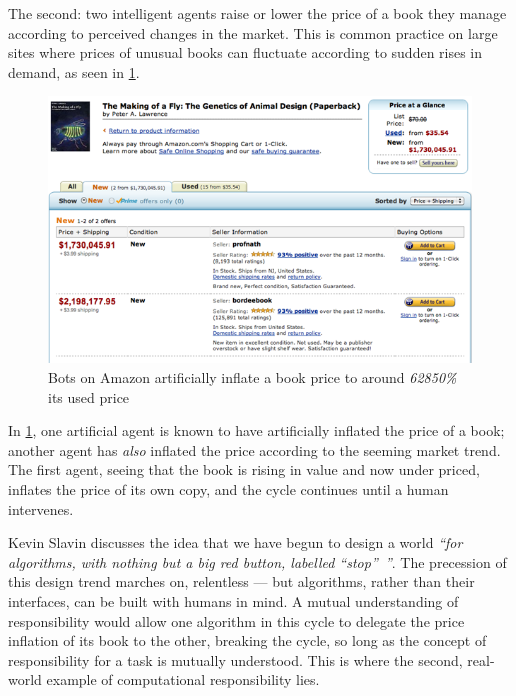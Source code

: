The second: two intelligent agents raise or lower the price of a book they manage according to perceived changes in the market. This is common practice on large sites where prices of unusual books can fluctuate according to sudden rises in demand, as seen in \cref{fig:amazon_price_hiking}.

\begin{figure}[h]
\label{fig:amazon_price_hiking}
\centering
\includegraphics[trim=0.7cm 0.7cm 0.7cm 0.7cm, scale=0.75]{images/amazon_price_hike_fly_genetics}
\caption{Bots on Amazon artificially inflate a book price to around \emph{62850\%} its used price}
\end{figure}

In \cref{fig:amazon_price_hiking}, one artificial agent is known to have artificially inflated the price of a book; another agent has \emph{also} inflated the price according to the seeming market trend. The first agent, seeing that the book is rising in value and now under priced, inflates the price of its own copy, and the cycle continues until a human intervenes.\par

Kevin Slavin discusses the idea that we have begun to design a world \emph{``for algorithms, with nothing but a big red button, labelled ``stop''~''}\cite{SlavinHOWWORLD}. The precession of this design trend marches on, relentless --- but algorithms, rather than their interfaces, can be built with humans in mind. A mutual understanding of responsibility would allow one algorithm in this cycle to delegate the price inflation of its book to the other, breaking the cycle, so long as the concept of responsibility for a task is mutually understood. This is where the second, real-world example of computational responsibility lies. \par

